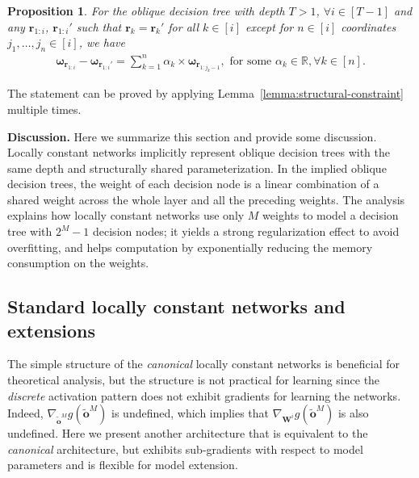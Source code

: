 \documentclass{article} \usepackage{iclr2020_conference,times}
\newtheorem{proposition}[theorem]{Proposition}
\def\vo{{\bm{o}}}
\def\vr{{\bm{r}}}
\def\vomega{{\bm{\omega}}}
\def\mW{{\bm{W}}}
\def\sR{{\mathbb{R}}}
\begin{document}
\begin{proposition}
For the oblique decision tree with depth $T > 1$, $\forall i \in [T-1]$ and any $\vr_{1:i}$, $\vr_{1:i}'$ such that $\vr_{k} = \vr_{k}'$ for all $k \in [i]$ except for $n \in [i]$ coordinates $j_1,\dots,j_n \in [i]$, we have
\vspace{-1mm}
\begin{align}
    \vomega_{\vr_{1:i}} - \vomega_{\vr_{1:i}'} =  \sum_{k=1}^n \alpha_k \times \vomega_{\vr_{1:j_k-1}},\text{ for some } \alpha_k \in \sR, \forall k \in [n].
\end{align}
\vspace{-6mm}
\label{prop:structural-constraint}
\end{proposition}
The statement can be proved by applying Lemma~\ref{lemma:structural-constraint} multiple times. 

\textbf{Discussion.}
Here we summarize this section and provide some discussion.
Locally constant networks implicitly represent oblique decision trees with the same depth and structurally shared parameterization. In the implied oblique decision trees, the weight of each decision node is a linear combination of a shared weight across the whole layer and all the preceding weights. The analysis explains how locally constant networks use only $M$ weights to model a decision tree with $2^M-1$ decision nodes; it yields a strong regularization effect to avoid overfitting, and helps computation by exponentially reducing the memory consumption on the weights. 









 \vspace{-1mm}
\subsection{Standard locally constant networks and extensions}\label{sec:standard}

The simple structure of the \emph{canonical} locally constant networks is beneficial for theoretical analysis, but the structure is not practical for learning since the \emph{discrete} activation pattern does not exhibit gradients for learning the networks. Indeed, $\nabla_{\tilde \vo^M} g(\tilde \vo^M)$ is undefined, which implies that $\nabla_{\mW^i} g(\tilde \vo^M)$ is also undefined. Here we present another architecture that is equivalent to the \emph{canonical} architecture, but exhibits sub-gradients with respect to model parameters and is flexible for model extension. 
\end{document}
